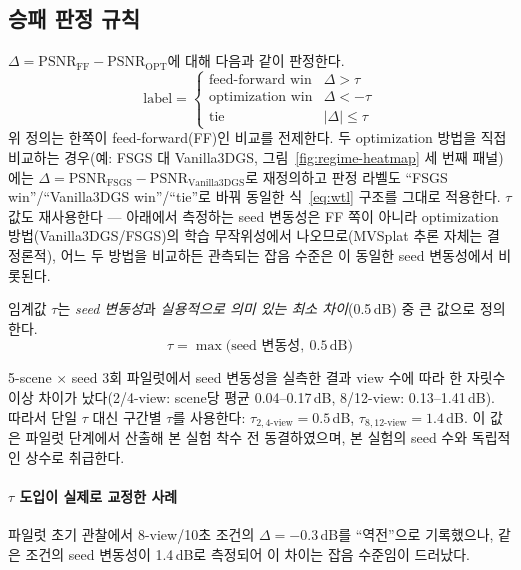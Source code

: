 \subsection{승패 판정 규칙}

$\Delta = \mathrm{PSNR}_{\mathrm{FF}} - \mathrm{PSNR}_{\mathrm{OPT}}$에 대해 다음과 같이 판정한다.
\begin{equation}
\text{label} =
\begin{cases}
\text{feed-forward win} & \Delta > \tau \\[2pt]
\text{optimization win} & \Delta < -\tau \\[2pt]
\text{tie} & \lvert \Delta \rvert \le \tau
\end{cases}
\label{eq:wtl}
\end{equation}
위 정의는 한쪽이 feed-forward(FF)인 비교를 전제한다. 두 optimization 방법을 직접 비교하는 경우(예: FSGS 대 Vanilla3DGS, 그림~\ref{fig:regime-heatmap} 세 번째 패널)에는 $\Delta = \mathrm{PSNR}_{\mathrm{FSGS}} - \mathrm{PSNR}_{\mathrm{Vanilla3DGS}}$로 재정의하고 판정 라벨도 ``FSGS win''/``Vanilla3DGS win''/``tie''로 바꿔 동일한 식~\eqref{eq:wtl} 구조를 그대로 적용한다. $\tau$ 값도 재사용한다 — 아래에서 측정하는 seed 변동성은 FF 쪽이 아니라 optimization 방법(Vanilla3DGS/FSGS)의 학습 무작위성에서 나오므로(MVSplat 추론 자체는 결정론적), 어느 두 방법을 비교하든 관측되는 잡음 수준은 이 동일한 seed 변동성에서 비롯된다.

임계값 $\tau$는 \emph{seed 변동성}과 \emph{실용적으로 의미 있는 최소 차이}(0.5\,dB) 중 큰 값으로 정의한다.
\begin{equation}
\tau = \max\bigl(\text{seed 변동성},\ 0.5\,\text{dB}\bigr)
\label{eq:tau}
\end{equation}

5-scene $\times$ seed 3회 파일럿에서 seed 변동성을 실측한 결과 view 수에 따라 한 자릿수 이상 차이가 났다(2/4-view: scene당 평균 0.04--0.17\,dB, 8/12-view: 0.13--1.41\,dB). 따라서 단일 $\tau$ 대신 구간별 $\tau$를 사용한다: $\tau_{2,4\text{-view}} = 0.5\,$dB, $\tau_{8,12\text{-view}} = 1.4\,$dB. 이 값은 파일럿 단계에서 산출해 본 실험 착수 전 동결하였으며, 본 실험의 seed 수와 독립적인 상수로 취급한다.

\paragraph{$\tau$ 도입이 실제로 교정한 사례} 파일럿 초기 관찰에서 8-view/10초 조건의 $\Delta = -0.3\,$dB를 ``역전''으로 기록했으나, 같은 조건의 seed 변동성이 1.4\,dB로 측정되어 이 차이는 잡음 수준임이 드러났다.

